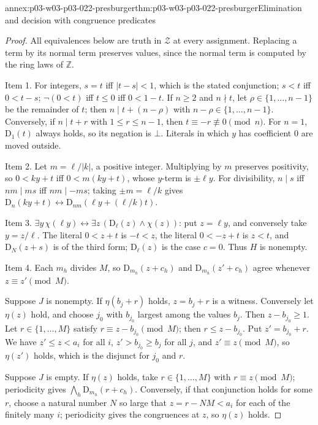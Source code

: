 \begin{annexitem}{annex:p03-w03-p03-022-presburger}{thm:p03-w03-p03-022-presburger}{Elimination and decision with congruence predicates}
\begin{proof}
All equivalences below are truth in \(\mathcal Z\) at every assignment.
Replacing a term by its normal term preserves values, since the normal
term is computed by the ring laws of \(\mathbb Z\).

Item 1. For integers, \(s=t\) iff \(|t-s|<1\), which is the stated
conjunction; \(s<t\) iff \(0<t-s\); \(\neg(0<t)\) iff \(t\le0\) iff
\(0<1-t\). If \(n\ge2\) and \(n\nmid t\), let \(\rho\in\{1,\ldots,n-1\}\)
be the remainder of \(t\); then \(n\mid t+(n-\rho)\) with
\(n-\rho\in\{1,\ldots,n-1\}\). Conversely, if \(n\mid t+r\) with
\(1\le r\le n-1\), then \(t\equiv-r\not\equiv0\pmod n\). For \(n=1\),
\(\mathrm D_1(t)\) always holds, so its negation is \(\bot\). Literals in
which \(y\) has coefficient \(0\) are moved outside.

Item 2. Let \(m=\ell/|k|\), a positive integer. Multiplying by \(m\)
preserves positivity, so \(0<ky+t\) iff \(0<m(ky+t)\), whose \(y\)-term is
\(\pm\ell y\). For divisibility, \(n\mid s\) iff \(nm\mid ms\) iff
\(nm\mid-ms\); taking \(\pm m=\ell/k\) gives
\(\mathrm D_n(ky+t)\leftrightarrow\mathrm D_{nm}(\ell y+(\ell/k)t)\).

Item 3. \(\exists y\,\chi(\ell y)\leftrightarrow
\exists z\,(\mathrm D_\ell(z)\land\chi(z))\): put \(z=\ell y\), and
conversely take \(y=z/\ell\). The literal \(0<z+t\) is \(-t<z\), the literal
\(0<-z+t\) is \(z<t\), and \(\mathrm D_N(z+s)\) is of the third form;
\(\mathrm D_\ell(z)\) is the case \(c=0\). Thus \(H\) is nonempty.

Item 4. Each \(m_h\) divides \(M\), so \(\mathrm D_{m_h}(z+c_h)\) and
\(\mathrm D_{m_h}(z'+c_h)\) agree whenever \(z\equiv z'\pmod M\).

Suppose \(J\) is nonempty. If \(\eta(b_j+r)\) holds, \(z=b_j+r\) is a
witness. Conversely let \(\eta(z)\) hold, and choose \(j_0\) with
\(b_{j_0}\) largest among the values \(b_j\). Then \(z-b_{j_0}\ge1\). Let
\(r\in\{1,\ldots,M\}\) satisfy \(r\equiv z-b_{j_0}\pmod M\); then
\(r\le z-b_{j_0}\). Put \(z'=b_{j_0}+r\). We have \(z'\le z<a_i\) for all
\(i\), \(z'>b_{j_0}\ge b_j\) for all \(j\), and \(z'\equiv z\pmod M\), so
\(\eta(z')\) holds, which is the disjunct for \(j_0\) and \(r\).

Suppose \(J\) is empty. If \(\eta(z)\) holds, take
\(r\in\{1,\ldots,M\}\) with \(r\equiv z\pmod M\); periodicity gives
\(\bigwedge_h\mathrm D_{m_h}(r+c_h)\). Conversely, if that conjunction holds for
some \(r\), choose a natural number \(N\) so large that
\(z=r-NM<a_i\) for each of the finitely many \(i\); periodicity gives the
congruences at \(z\), so \(\eta(z)\) holds.


\end{proof}
\end{annexitem}
